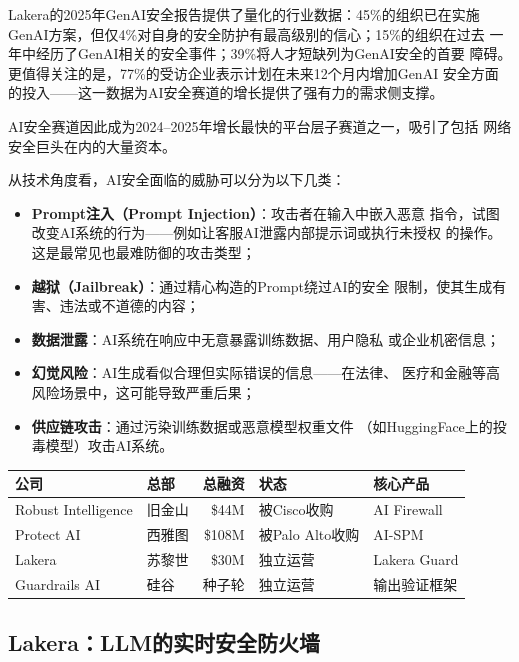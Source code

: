Lakera的2025年GenAI安全报告提供了量化的行业数据：45\%的组织已在实施
GenAI方案，但仅4\%对自身的安全防护有最高级别的信心；15\%的组织在过去
一年中经历了GenAI相关的安全事件；39\%将人才短缺列为GenAI安全的首要
障碍。更值得关注的是，77\%的受访企业表示计划在未来12个月内增加GenAI
安全方面的投入——这一数据为AI安全赛道的增长提供了强有力的需求侧支撑。

AI安全赛道因此成为2024--2025年增长最快的平台层子赛道之一，吸引了包括
网络安全巨头在内的大量资本。

从技术角度看，AI安全面临的威胁可以分为以下几类：
\begin{itemize}
  \item \textbf{Prompt注入（Prompt Injection）}：攻击者在输入中嵌入恶意
    指令，试图改变AI系统的行为——例如让客服AI泄露内部提示词或执行未授权
    的操作。这是最常见也最难防御的攻击类型；
  \item \textbf{越狱（Jailbreak）}：通过精心构造的Prompt绕过AI的安全
    限制，使其生成有害、违法或不道德的内容；
  \item \textbf{数据泄露}：AI系统在响应中无意暴露训练数据、用户隐私
    或企业机密信息；
  \item \textbf{幻觉风险}：AI生成看似合理但实际错误的信息——在法律、
    医疗和金融等高风险场景中，这可能导致严重后果；
  \item \textbf{供应链攻击}：通过污染训练数据或恶意模型权重文件
    （如HuggingFace上的投毒模型）攻击AI系统。
\end{itemize}

\begin{keybox}[AI安全赛道核心公司与融资]
\small
\begin{tabularx}{\textwidth}{l l r l l}
\toprule
\rowcolor{figLightGray}
\textbf{公司} & \textbf{总部} & \textbf{总融资} & \textbf{状态} & \textbf{核心产品} \\
\midrule
Robust Intelligence & 旧金山 & \$44M  & 被Cisco收购  & AI Firewall \\
Protect AI          & 西雅图 & \$108M & 被Palo Alto收购 & AI-SPM \\
Lakera              & 苏黎世 & \$30M  & 独立运营     & Lakera Guard \\
Guardrails AI       & 硅谷   & 种子轮 & 独立运营     & 输出验证框架 \\
\bottomrule
\end{tabularx}
\end{keybox}

\subsection{Lakera：LLM的实时安全防火墙}
\label{subsec:lakera}

